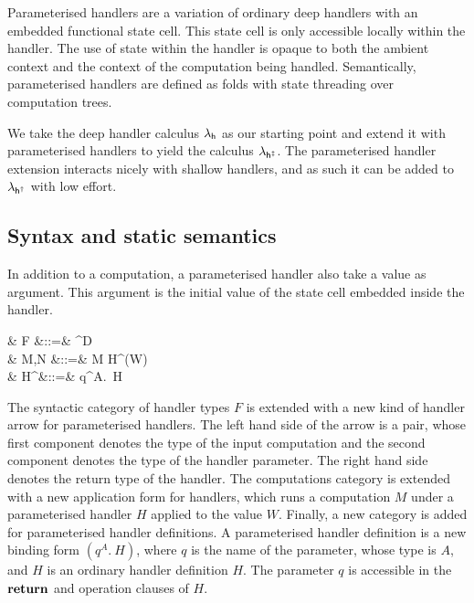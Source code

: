 \documentclass[12pt,phd,lfcs,twoside,openright,logo,leftchapter,normalheadings]{infthesis}
\theoremstyle{plain}
\theoremstyle{definition}
\begin{document}
Parameterised handlers are a variation of ordinary deep handlers with
an embedded functional state cell. This state cell is only accessible
locally within the handler. The use of state within the handler is
opaque to both the ambient context and the context of the computation
being handled. Semantically, parameterised handlers are defined as
folds with state threading over computation trees.

We take the deep handler calculus $\lambda_{\mathsf{h}}$ as our starting point and
extend it with parameterised handlers to yield the calculus
$\lambda_{\mathsf{h^{\ddagger}}}$. The parameterised handler extension interacts nicely with
shallow handlers, and as such it can be added to $\lambda_{\mathsf{h^\dagger}}$ with low
effort.

\subsection{Syntax and static semantics}
In addition to a computation, a parameterised handler also take a
value as argument. This argument is the initial value of the state
cell embedded inside the handler.
%
\begin{syntax}
  & F &::=& \cdots \mid {} \Rightarrow^\param D\\
   & M,N        &::=& \cdots \mid \ParamHandle\; M \;\With\; H^\param(W)\\
   & H^\param   &::=& q^A.~H
\end{syntax}
%
The syntactic category of handler types $F$ is extended with a new
kind of handler arrow for parameterised handlers. The left hand side
of the arrow is a pair, whose first component denotes the type of the
input computation and the second component denotes the type of the
handler parameter. The right hand side denotes the return type of the
handler.
%
The computations category is extended with a new application form for
handlers, which runs a computation $M$ under a parameterised handler
$H$ applied to the value $W$.
%
Finally, a new category is added for parameterised handler
definitions. A parameterised handler definition is a new binding form
$(q^A.~H)$, where $q$ is the name of the parameter, whose type is $A$,
and $H$ is an ordinary handler definition $H$. The parameter $q$ is
accessible in the $\mathbf{return}$ and operation clauses of $H$.
\end{document}
